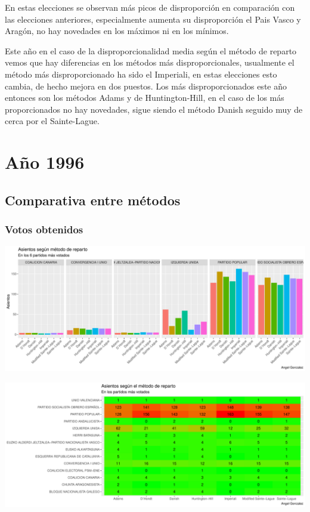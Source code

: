 \documentclass[12pt,a4paper,]{book}
\numberwithin{dummy}{section}
\theoremstyle{ocrenumbox}
\theoremstyle{blacknumex}
\theoremstyle{blacknumbox}
\theoremstyle{ocrenum}
\theoremstyle{ocrenum}
\begin{document}
En estas elecciones se observan más picos de disproporción en
comparación con las elecciones anteriores, especialmente aumenta su
disproporción el Pais Vasco y Aragón, no hay novedades en los máximos ni
en los mínimos.

Este año en el caso de la disproporcionalidad media según el método de
reparto vemos que hay diferencias en los métodos más disproporcionales,
usualmente el método más disproporcionado ha sido el Imperiali, en estas
elecciones esto cambia, de hecho mejora en dos puestos. Los más
disproporcionados este año entonces son los métodos Adams y de
Huntington-Hill, en el caso de los más proporcionados no hay novedades,
sigue siendo el método Danish seguido muy de cerca por el Sainte-Lague.

\hypertarget{auxf1o-1996}{%
\section{Año 1996}\label{auxf1o-1996}}

\hypertarget{comparativa-entre-muxe9todos-6}{%
\subsection{Comparativa entre
métodos}\label{comparativa-entre-muxe9todos-6}}

\hypertarget{votos-obtenidos-6}{%
\subsubsection{Votos obtenidos}\label{votos-obtenidos-6}}

\begin{center}\includegraphics[width=0.95\linewidth]{figurasR/unnamed-chunk-113-1} \end{center}

\begin{center}\includegraphics[width=0.95\linewidth]{figurasR/unnamed-chunk-113-2} \end{center}
\end{document}
